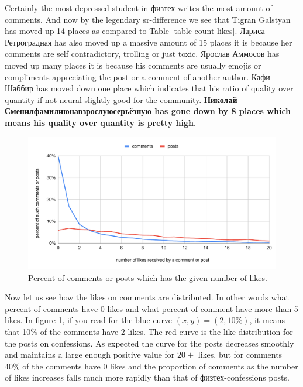 \documentclass[
	12pt
] {article}
\begin{document}
	Certainly the most depressed student in физтех writes the most amount of comments. And now by the legendary sr-difference we see that Tigran Galstyan has moved up 14 places as compared to Table \ref{table-count-likes}. Лариса Ретроградная has also moved up a massive amount of 15 places it is because her comments are self contradictory, trolling or just toxic. Ярослав Аммосов has moved up many places it is because his comments are usually emojis or compliments appreciating the post or a comment of another author. Кафи Шаббир has moved down one place which indicates that his ratio of quality over quantity if not neural slightly good for the community. \textbf{Николай Сменилфамилиюнавзрослуюсерьёзную has gone down by 8 places which means his quality over quantity is pretty high}.

	\begin{figure}[H]
		\centering
		\includegraphics[width=1\textwidth]{fig-proportion-of-posts-or-comments-with-certain-likes}
		\caption{Percent of comments or posts which has the given number of likes.}
		\label{fig-proportion-of-posts-or-comments-with-certain-likes}
	\end{figure}
	Now let us see how the likes on comments are distributed. In other words what percent of comments have 0 likes and what percent of comment have more than 5 likes. In figure \ref{fig-proportion-of-posts-or-comments-with-certain-likes}, if you read for the blue curve $(x, y) = (2, 10\%)$, it means that \num{10}\% of the comments have \num{2} likes. The red curve is the like distribution for the posts on confessions. As expected the curve for the posts decreases smoothly and maintains a large enough positive value for $\num{20} + $ likes, but for comments $\num{40}\%$ of the comments have 0 likes and the proportion of comments as the number of likes increases falls much more rapidly than that of физтех-confessions posts.
\end{document}
